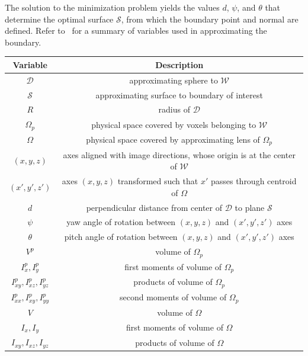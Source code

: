 %
The solution to the minimization problem yields the values $d$, $\psi$, and $\theta$ that determine the optimal surface $\mathcal{S}$, from which the boundary point and normal are defined. Refer to~ for a summary of variables used in approximating the boundary.

\begin{table}[]
 \centering
   \begin{tabular}{|c||c|}
   \hline
   {\textbf{Variable}} & {\textbf{Description}} \\ \hline \hline
   $\mathcal{D}$ & approximating sphere to $\mathcal{W}$ \\ \hline
   $\mathcal{S}$ & approximating surface to boundary of interest \\ \hline      
   $R$ & radius of $\mathcal{D}$ \\ \hline   
   $\Omega_p$ & physical space covered by voxels belonging to $\mathcal{W}$ \\ \hline
   $\Omega$ & physical space covered by approximating lens of $\Omega_p$ \\ \hline      
   $(x,y,z)$ & axes aligned with image directions, whose origin is at the center of $\mathcal{W}$\\ \hline
   {$(x',y',z')$} & axes $(x,y,z)$ transformed such that $x'$ passes through centroid of $\Omega$ \\ \hline
   $d$ & perpendicular distance from center of $\mathcal{D}$ to plane $\mathcal{S}$  \\ \hline
   $\psi$ & yaw angle of rotation between $(x,y,z)$ and $(x',y',z')$ axes \\ \hline   
   $\theta$ & pitch angle of rotation between $(x,y,z)$ and $(x',y',z')$ axes \\ \hline
   $V^p$ & volume of $\Omega_p$ \\ \hline
   $I_{x}^p, I_y^p$ & first moments of volume of $\Omega_p$ \\ \hline     
   $I_{xy}^p, I_{xz}^p, I_{yz}^p$ & products of volume of $\Omega_p$ \\ \hline      
   $I_{xx}^p, I_{xy}^p, I_{yy}^p$ & second moments of volume of $\Omega_p$ \\ \hline
   $V$ & volume of $\Omega$ \\ \hline
   $I_{x}, I_y$ & first moments of volume of $\Omega$ \\ \hline
   $I_{xy}, I_{xz}, I_{yz}$ & products of volume of $\Omega$ \\ \hline   

\end{tabular}
\end{table}
